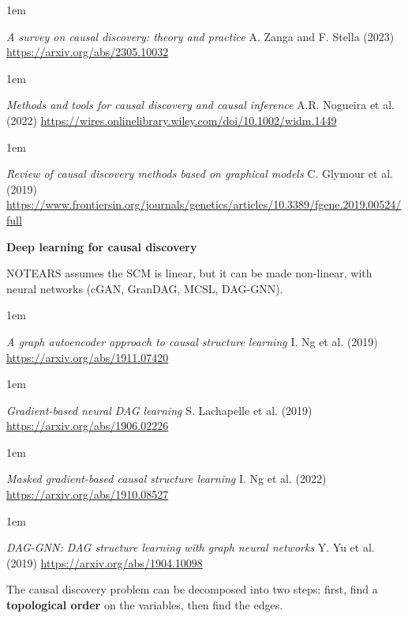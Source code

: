 \documentclass[a5paper]{article}
\let\d\textbf
\newenvironment{reference}{%
  \medskip\goodbreak
  \parskip 0pt
  \raggedright
  \leftskip 1em
  \obeylines
}{\par\medskip\goodbreak}
\def\subsection#1{{\par\bigskip\goodbreak\large\bfseries #1\par}}
\begin{document}
\begin{reference}
  \emph{A survey on causal discovery: theory and practice}
  A. Zanga and F. Stella (2023)
  \url{https://arxiv.org/abs/2305.10032}
\end{reference}

\begin{reference}
  \emph{Methods and tools for causal discovery and causal inference}
  A.R. Nogueira et al. (2022)
  \url{https://wires.onlinelibrary.wiley.com/doi/10.1002/widm.1449}
\end{reference}

\begin{reference}
  \emph{Review of causal discovery methods based on graphical models}
  C. Glymour  et al. (2019)
  \url{https://www.frontiersin.org/journals/genetics/articles/10.3389/fgene.2019.00524/full}
\end{reference}

\subsection{Deep learning for causal discovery}

NOTEARS assumes the SCM is linear, but it can be made non-linear, with neural networks
(cGAN, GranDAG, MCSL, DAG-GNN).

\begin{reference}
  \emph{A graph autoencoder approach to causal structure learning}
  I. Ng et al. (2019)
  \url{https://arxiv.org/abs/1911.07420}
\end{reference}

\begin{reference}
  \emph{Gradient-based neural DAG learning}
  S. Lachapelle et al. (2019)
  \url{https://arxiv.org/abs/1906.02226}
\end{reference}

\begin{reference}
  \emph{Masked gradient-based causal structure learning}
  I. Ng et al. (2022)
  \url{https://arxiv.org/abs/1910.08527}
\end{reference}

\begin{reference}
  \emph{DAG-GNN: DAG structure learning with graph neural networks}
  Y. Yu et al. (2019)
  \url{https://arxiv.org/abs/1904.10098}
\end{reference}

The causal discovery problem can be decomposed into two steps:
first, find a \d{topological order} on the variables, then find the edges.
\end{document}
